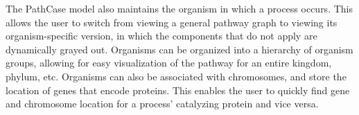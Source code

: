The PathCase model also maintains the organism in which a process occurs.  This
allows the user to switch from viewing a general pathway graph to viewing its
organism-specific version, in which the components that do not apply are
dynamically grayed out.  Organisms can be organized into a hierarchy of organism
groups, allowing for easy visualization of the pathway for an entire kingdom,
phylum, etc.  Organisms can also be associated with chromosomes, and store the
location of genes that encode proteins. This enables the user to quickly find
gene and chromosome location for a process’ catalyzing protein and vice versa.
